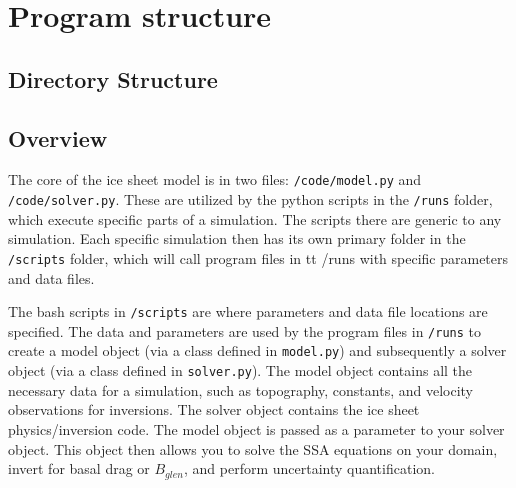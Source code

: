 \documentclass[11pt, reqno, nocenter]{article}
\begin{document}
\section{Program structure}

\subsection{Directory Structure}


\subsection{Overview}

The core of the ice sheet model is in two files: {\tt /code/model.py} and {\tt /code/solver.py}. These are utilized by the python scripts in the {\tt /runs} folder, which execute specific parts of a simulation. The scripts there are generic to any simulation. Each specific simulation then has its own primary folder in the {\tt /scripts} folder, which will call program files in {tt /runs} with specific parameters and data files.

The bash scripts in {\tt /scripts} are where parameters and data file locations are specified. The data and parameters are used by the program files in {\tt /runs} to create a model object (via a class defined in {\tt model.py}) and subsequently a solver object (via a class defined in {\tt solver.py}). The model object contains all the necessary data for a simulation, such as topography, constants, and velocity observations for inversions. The solver object contains the ice sheet physics/inversion code. The model object is passed as a parameter to your solver object. This object then allows you to solve the SSA equations on your domain, invert for basal drag or $B_{glen}$, and perform uncertainty quantification. 
\end{document}

